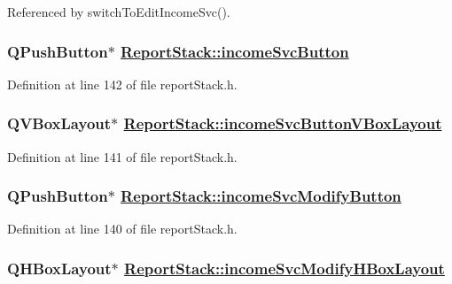 Referenced by switch\-To\-Edit\-Income\-Svc().\hypertarget{classReportStack_r66}{
\subsubsection[incomeSvcButton]{\setlength{\rightskip}{0pt plus 5cm}QPush\-Button$\ast$ \hyperlink{classReportStack_r66}{Report\-Stack::income\-Svc\-Button}}}
\label{classReportStack_r66}


Definition at line 142 of file report\-Stack.h.\hypertarget{classReportStack_r65}{
\subsubsection[incomeSvcButtonVBoxLayout]{\setlength{\rightskip}{0pt plus 5cm}QVBox\-Layout$\ast$ \hyperlink{classReportStack_r65}{Report\-Stack::income\-Svc\-Button\-VBox\-Layout}}}
\label{classReportStack_r65}


Definition at line 141 of file report\-Stack.h.\hypertarget{classReportStack_r64}{
\subsubsection[incomeSvcModifyButton]{\setlength{\rightskip}{0pt plus 5cm}QPush\-Button$\ast$ \hyperlink{classReportStack_r64}{Report\-Stack::income\-Svc\-Modify\-Button}}}
\label{classReportStack_r64}


Definition at line 140 of file report\-Stack.h.\hypertarget{classReportStack_r63}{
\subsubsection[incomeSvcModifyHBoxLayout]{\setlength{\rightskip}{0pt plus 5cm}QHBox\-Layout$\ast$ \hyperlink{classReportStack_r63}{Report\-Stack::income\-Svc\-Modify\-HBox\-Layout}}}
\label{classReportStack_r63}


